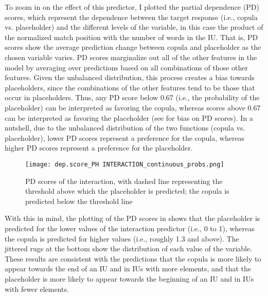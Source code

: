 \documentclass[output=paper,colorlinks,citecolor=brown
\ChapterDOI{10.5281/zenodo.15697581}
]{langscibook}
\begin{document}
To zoom in on the effect of this predictor, I plotted the partial dependence (PD) scores, which represent the dependence between the target response (i.e., copula vs. placeholder) and the different levels of the variable, in this case the product of the normalized match position with the number of words in the IU.
That is, PD scores show the average prediction change between copula and placeholder as the chosen variable varies. 
PD scores marginalize out all of the other features in the model by averaging over predictions based on all combinations of those other features. 
Given the unbalanced distribution, this process creates a bias towards placeholders, since the combinations of the other features tend to be those that occur in placeholders. 
Thus, any PD score below 0.67 (i.e., the probability of the placeholder) can be interpreted as favoring the copula, whereas scores above 0.67 can be interpreted as favoring the placeholder (see \citealt[370]{Hastie-etal2009} for bias on PD scores). 
In a nutshell, due to the unbalanced distribution of the two functions (copula vs. placeholder), lower PD scores represent a preference for the copula, whereas higher PD scores represent a preference for the placeholder. 

\begin{figure}
    \centering
    \texttt{[image: dep.score\_PH~INTERACTION\_continuous\_probs.png]}
    \caption{PD scores of the interaction, with dashed line representing the threshold above which the placeholder is predicted; the copula is predicted below the threshold line}
    \label{fig:dp.ph.inter}
\end{figure}

With this in mind, the plotting of the PD scores in  shows that the placeholder is predicted for the lower values of the interaction predictor (i.e., 0 to 1), whereas the copula is predicted for higher values (i.e., roughly 1.3 and above).
The jittered rugs at the bottom show the distribution of each value of the variable. 
These results are consistent with the predictions that the copula is more likely to appear towards the end of an IU and in IUs with more elements, and that the placeholder is more likely to appear towards the beginning of an IU and in IUs with fewer elements. 
\end{document}
